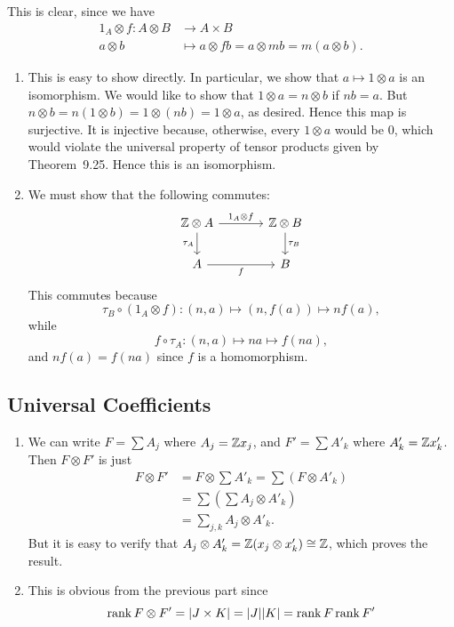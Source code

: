 \documentclass[../../solutions.tex]{subfiles}
\begin{document}
\begin{exercise} \leavevmode
This is clear, since we have
\begin{align*}
1_A\otimes f:A\otimes B&\to A\times B\\a\otimes b&\mapsto a\otimes fb=a\otimes mb=m(a\otimes b).
\end{align*}
\end{exercise}

\begin{exercise} \leavevmode
\begin{enumerate}
\item
This is easy to show directly.
In particular, we show that $a\mapsto1\otimes a$ is an isomorphism.
We would like to show that $1\otimes a=n\otimes b$ if $nb=a$.
But $n\otimes b=n(1\otimes b)=1\otimes(nb)=1\otimes a$, as desired.
Hence this map is surjective.
It is injective because, otherwise, every $1\otimes a$ would be 0, which would violate the universal property of tensor products given by Theorem~9.25.
Hence this is an isomorphism.

\item
We must show that the following commutes:
\[
\begin{tikzcd}[column sep=large]
\ZZ\otimes A\ar[r,"1_A\otimes f"]\ar[d,"\tau_A",swap] & \ZZ\otimes B\ar[d,"\tau_B"] \\
A\ar[r,"f",swap] & B
\end{tikzcd}
\]
This commutes because
\[\tau_B\circ(1_A\otimes f):(n,a)\mapsto(n,f(a))\mapsto nf(a),\]
while
\[f\circ\tau_A:(n,a)\mapsto na\mapsto f(na),\]
and $nf(a)=f(na)$ since $f$ is a homomorphism.
\end{enumerate}
\end{exercise}

\subsection{Universal Coefficients}
\begin{exercise} \leavevmode
\begin{enumerate}
\item 
We can write $F=\sum A_j$ where $A_j=\mathbb{Z} x_j$, and $F'=\sum A'_k$ where $A'_k=\mathbb{Z} x'_k$.
Then $F\otimes F'$ is just
\begin{align*}
F\otimes F'&=F\otimes\sum A'_k=\sum(F\otimes A'_k)\\
&=\sum\left(\sum A_j\otimes A'_k\right)\\
&=\sum_{j,k}A_j\otimes A'_k.
\end{align*}
But it is easy to verify that $A_j\otimes A'_k=\mathbb{Z}(x_j\otimes x'_k)\cong\mathbb{Z}$, which proves the result.

\item 
This is obvious from the previous part since
\[\operatorname{rank} F\otimes F'=|J\times K|=|J||K|=\operatorname{rank} F\operatorname{rank} F'\]
\end{enumerate}
\end{exercise}
\end{document}
